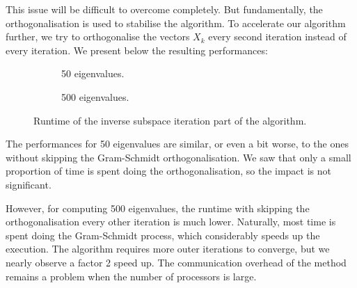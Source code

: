 This issue will be difficult to overcome completely.
But fundamentally, the orthogonalisation is used to stabilise the algorithm.
To accelerate our algorithm further, we try to orthogonalise the vectors \(X_k\) every second iteration instead of every iteration.
We present below the resulting performances:

\begin{figure}[H]
  \centering
  \begin{subfigure}[b]{0.5\textwidth}
   
   \caption{50 eigenvalues.}
  \end{subfigure}
  \begin{subfigure}[b]{0.45\textwidth}
   
   \caption{500 eigenvalues.}
  \end{subfigure}
  \caption{Runtime of the inverse subspace iteration part of the algorithm.}
\end{figure}

The performances for 50 eigenvalues are similar, or even a bit worse, to the ones without skipping the Gram-Schmidt orthogonalisation.
We saw that only a small proportion of time is spent doing the orthogonalisation, so the impact is not significant.

However, for computing 500 eigenvalues, the runtime with skipping the orthogonalisation every other iteration is much lower. 
Naturally, most time is spent doing the Gram-Schmidt process, which considerably speeds up the execution.
The algorithm requires more outer iterations to converge, but we nearly observe a factor 2 speed up.
The communication overhead of the method remains a problem when the number of processors is large.

